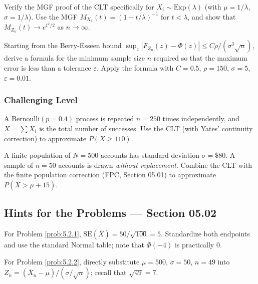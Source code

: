 \begin{problema}
	\label{prob:5.2.7}
	Verify the MGF proof of the CLT specifically for $X_i \sim \text{Exp}(\lambda)$ (with $\mu=1/\lambda$, $\sigma=1/\lambda$). Use the MGF $M_{X_1}(t) = (1-t/\lambda)^{-1}$ for $t<\lambda$, and show that $M_{Z_n}(t) \to e^{t^2/2}$ as $n\to\infty$.
\end{problema}

\begin{problema}
	\label{prob:5.2.8}
	Starting from the Berry-Esseen bound $\sup_z|F_{Z_n}(z)-\Phi(z)| \le C\rho/(\sigma^3\sqrt{n})$, derive a formula for the minimum sample size $n$ required so that the maximum error is less than a tolerance $\varepsilon$. Apply the formula with $C=0.5$, $\rho=150$, $\sigma=5$, $\varepsilon=0.01$.
\end{problema}

\subsubsection*{Challenging Level}

\begin{problema}
	\label{prob:5.2.9}
	A Bernoulli$(p=0.4)$ process is repeated $n=250$ times independently, and $X=\sum X_i$ is the total number of successes. Use the CLT (with Yates' continuity correction) to approximate $P(X \ge 110)$.
\end{problema}

\begin{problema}
	\label{prob:5.2.10}
	A finite population of $N=500$ accounts has standard deviation $\sigma=\$80$. A sample of $n=50$ accounts is drawn \emph{without replacement}. Combine the CLT with the finite population correction (FPC, Section 05.01) to approximate $P(\bar{X} > \mu + 15)$.
\end{problema}

\subsection*{Hints for the Problems --- Section 05.02}

\begin{sugerencia}
	\label{sug:5.2.1}
	For Problem \ref{prob:5.2.1}, $\text{SE}(\bar X)=50/\sqrt{100}=5$. Standardize both endpoints and use the standard Normal table; note that $\Phi(-4)$ is practically $0$.
\end{sugerencia}

\begin{sugerencia}
	\label{sug:5.2.2}
	For Problem \ref{prob:5.2.2}, directly substitute $\mu=500$, $\sigma=50$, $n=49$ into $Z_n=(\bar X_n-\mu)/(\sigma/\sqrt n)$; recall that $\sqrt{49}=7$.
\end{sugerencia}

